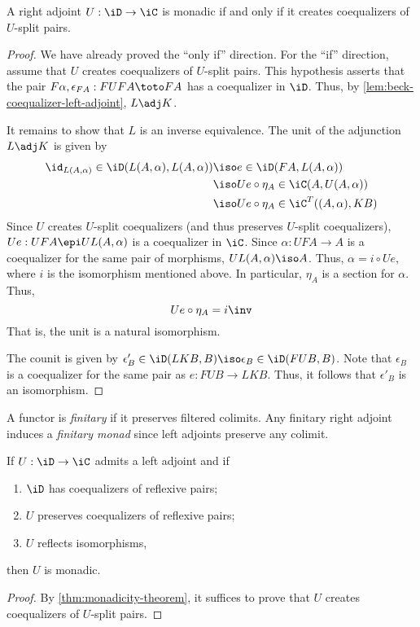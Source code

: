 \documentclass{amsart}
\begin{document}
\begin{thm}\label{thm:monadicity-theorem}
  A right adjoint $U : \iD \to \iC$ is monadic if and only if it creates coequalizers of $U$-split pairs.
\end{thm}
\begin{proof}
  We have already proved the ``only if'' direction.
  For the ``if'' direction, assume that $U$ creates coequalizers of $U$-split pairs.
  This hypothesis asserts that the pair $F\alpha,\epsilon_{FA} : FUFA \toto FA$ has a coequalizer in $\iD$.
  Thus, by \cref{lem:beck-coequalizer-left-adjoint}, $L \adj K$.

  It remains to show that $L$ is an inverse equivalence.
  The unit of the adjunction $L \adj K$ is given by
  \begin{align}
    \id_{L(A,\alpha)} \in \iD(L(A,\alpha), L(A,\alpha)) &\iso e \in \iD(FA, L(A,\alpha))\\
                                       &\iso Ue \circ \eta_{A} \in \iC(A,U(A,\alpha))\\
                                       &\iso Ue \circ \eta_{A} \in \iC^{T}((A,\alpha),KB)
  \end{align}
  Since $U$ creates $U$-split coequalizers (and thus preserves $U$-split coequalizers), $Ue : UFA \epi UL(A,\alpha)$ is a coequalizer in $\iC$.
  Since $\alpha : UFA \to A$ is a coequalizer for the same pair of morphisms, $UL(A,\alpha) \iso A$.
  Thus, $\alpha = i \circ Ue$, where $i$ is the isomorphism mentioned above.
  In particular, $\eta_{A}$ is a section for $\alpha$.
  Thus,
  \[
    Ue \circ \eta_{A} = i\inv
  \]
  That is, the unit is a natural isomorphism.

  The counit is given by $\epsilon'_{B} \in \iD(LKB, B) \iso \epsilon_{B} \in \iD(FUB,B)$.
  Note that $\epsilon_{B}$ is a coequalizer for the same pair as $e : FUB \to LKB$.
  Thus, it follows that $\epsilon'_{B}$ is an isomorphism.
\end{proof}

\begin{defn}
  A functor is \emph{finitary} if it preserves filtered colimits.
  Any finitary right adjoint induces a \emph{finitary monad} since left adjoints preserve any colimit.
\end{defn}

\begin{thm}
  If $U : \iD \to \iC$ admits a left adjoint and if
  \begin{enumerate}
  \item $\iD$ has coequalizers of reflexive pairs;
  \item $U$ preserves coequalizers of reflexive pairs;
  \item $U$ reflects isomorphisms,
  \end{enumerate}
  then $U$ is monadic.
\end{thm}
\begin{proof}
  By \cref{thm:monadicity-theorem}, it suffices to prove that $U$ creates coequalizers of $U$-split pairs.
\end{proof}



\end{document}
